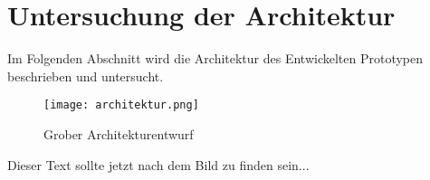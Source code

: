\section{Untersuchung der Architektur}

Im Folgenden Abschnitt wird die Architektur des Entwickelten Prototypen beschrieben und untersucht.

\begin{figure}[h]
    \texttt{[image: architektur.png]}
    \caption{Grober Architekturentwurf}
    \label{fig:Architektur}
\end{figure}

Dieser Text sollte jetzt nach dem Bild zu finden sein...

\pagebreak